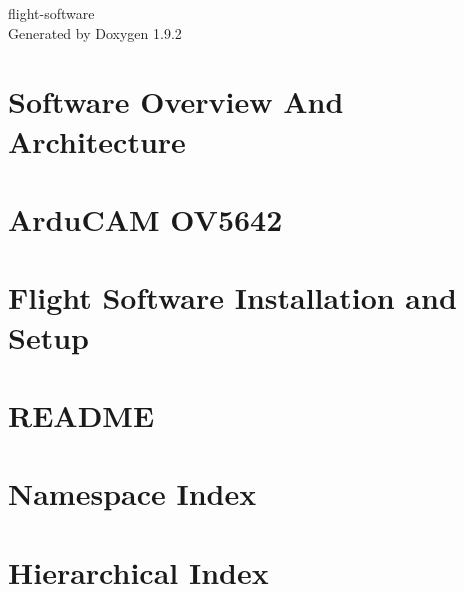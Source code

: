 \documentclass[twoside]{book}
\newcommand{\+}{\discretionary{\mbox{\scriptsize$\hookleftarrow$}}{}{}}
\newcommand{\clearemptydoublepage}{%
    \newpage{\pagestyle{empty}\cleardoublepage}%
  }
\begin{document}
  \raggedbottom
    \hypersetup{pageanchor=false,
                bookmarksnumbered=true,
                pdfencoding=unicode
               }
  \begin{titlepage}
  \vspace*{7cm}
  \begin{center}%
  {\Large flight-\/software}\\
  \vspace*{1cm}
  {\large Generated by Doxygen 1.9.2}\\
  \end{center}
  \end{titlepage}
  \clearemptydoublepage
  \tableofcontents
  \clearemptydoublepage
  \hypersetup{pageanchor=true}
\chapter{Software Overview And Architecture}
\label{index}\hypertarget{index}{}
\chapter{Ardu\+CAM OV5642}
\label{md__ardu_c_a_m__setup}

\chapter{Flight Software Installation and Setup}
\label{md__installation}

\chapter{README}
\label{md__c___users_lt17550__pycharm_projects__p_r_o_v_e__pathfinder__r_e_a_d_m_e}

\chapter{Namespace Index}

\chapter{Hierarchical Index}

\end{document}
